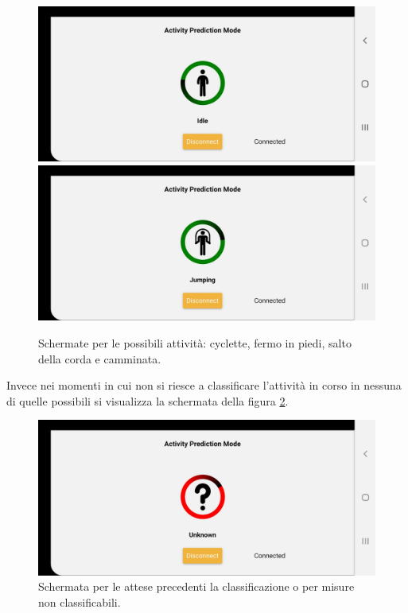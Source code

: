 \begin{figure}[tbh]
	\centering
	\includegraphics[width=0.4\linewidth]{./ImageFiles/idle}
	\includegraphics[width=0.4\linewidth]{./ImageFiles/jumping}
	\caption{Schermate per le possibili attività: cyclette, fermo in piedi, salto della corda e camminata.}
	\label{fig:attivitafisica}
\end{figure}

Invece nei momenti in cui non si riesce a classificare l'attività in corso in nessuna di quelle possibili si visualizza la schermata della figura \ref{fig:attesa}.

\begin{figure}[tbh]
	\centering
	\includegraphics[width=0.4\linewidth]{./ImageFiles/unknown}
	\caption{Schermata per le attese precedenti la classificazione o per misure non classificabili.}
	\label{fig:attesa}
\end{figure}